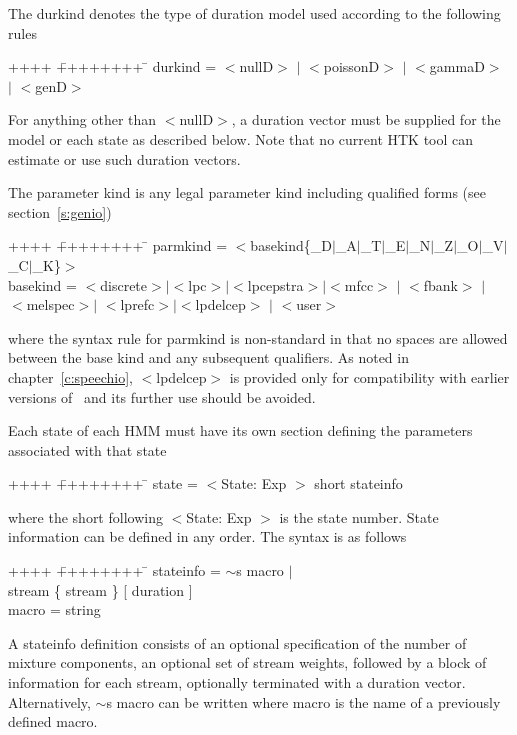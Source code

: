 The {\sf durkind} denotes the type of duration
model used according to the following rules
{\sf
\begin{tabbing}
++++ \= ++++++++ \=  \kill
\>  durkind =\> $<$nullD$>$ $|$ $<$poissonD$>$ $|$ $<$gammaD$>$ $|$ $<$genD$>$ 
\end{tabbing}
}
\noindent
For anything other than {\sf $<$nullD$>$}, a duration vector must
be supplied for the model or each state as described below. Note that no
current HTK tool can estimate or use such duration vectors.  

The parameter kind is any legal parameter kind including qualified forms
(see section~\ref{s:genio})
{\sf
\begin{tabbing}
++++ \= ++++++++ \=  \kill
\>  parmkind =\> $<$basekind\{\_D$|$\_A$|$\_T$|$\_E$|$\_N$|$\_Z$|$\_O$|$\_V$|$\_C$|$\_K\}$>$ \\
\>  basekind =\> $<$discrete$>$$|$$<$lpc$>$$|$$<$lpcepstra$>$$|$$<$mfcc$>$ $|$ $<$fbank$>$ $|$ \\
 \> \>          $<$melspec$>$$|$ $<$lprefc$>$$|$$<$lpdelcep$>$ $|$ $<$user$>$ 
\end{tabbing}
}
\noindent
where the syntax rule for {\sf parmkind} is non-standard in that no spaces
are allowed between the base kind and any subsequent qualifiers.
As noted in chapter~\ref{c:speechio}, {\sf $<$lpdelcep$>$} is 
provided only for compatibility
with earlier versions of \HTK\ and its further use should be avoided.

Each state of each HMM must have its own section defining the parameters
associated with that state
{\sf
\begin{tabbing}
++++ \= ++++++++ \=  \kill
\> state =\>  $<$State: Exp $>$ short stateinfo
\end{tabbing}
}
\noindent
where the  short following {\sf $<$State: Exp $>$} is the state number.  State
information can be defined in any order.  The syntax is as follows
{\sf
\begin{tabbing}
++++ \= ++++++++ \=  \kill
\>   stateinfo = \> $\sim$s macro $|$ \\
  \>\>              [ mixes ] [ weights ] stream \{ stream \} [ duration ] \\
\>   macro     = \> string
\end{tabbing}
}
\noindent
A {\sf stateinfo} definition consists of an 
optional specification of the number of mixture components, an optional set of stream weights,
followed by a block of information for each stream, optionally terminated with
a duration vector.  Alternatively, {\sf $\sim$s macro} can be
written where {\sf macro} is the name of a previously defined macro.


